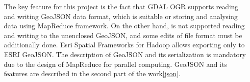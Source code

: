 \documentclass[a4paper,12pt,oneside]{report}
\begin{document}
	The key feature for this project is the fact that GDAL OGR supports reading and writing GeoJSON data
	format, which is suitable  or storing and analysing data using MapReduce framework. On the other hand, is not supported reading and writing to the unenclosed GeoJSON, and some edits of file format must be additionally done. 
	Esri Spatial Frameworks for Hadoop allows exporting only to ESRI GeoJSON. The description of
	GeoJSON and its serialization is mandatory due to the design of MapReduce 
	for parallel computing. GeoJSON and its features are described in the second
	part of the work\ref{json}.
	
	
	
	
	
	
\end{document}
